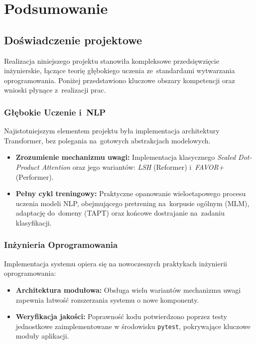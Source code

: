 \documentclass[a4paper,11pt,twoside]{report}
\theoremstyle{definition}
\begin{document}
\chapter{Podsumowanie}

\section{Doświadczenie projektowe}

Realizacja niniejszego projektu stanowiła kompleksowe przedsięwzięcie inżynierskie, łączące teorię głębokiego uczenia ze~standardami wytwarzania oprogramowania. Poniżej przedstawiono kluczowe obszary kompetencji oraz wnioski płynące z~realizacji prac.

\subsection{Głębokie Uczenie i~NLP}

Najistotniejszym elementem projektu była implementacja architektury Transformer, bez polegania na~gotowych abstrakcjach modelowych.
\begin{itemize}
    \item \textbf{Zrozumienie mechanizmu uwagi:} Implementacja klasycznego \textit{Scaled Dot-Product Attention} oraz jego wariantów: \textit{LSH} (Reformer) i~\textit{FAVOR+} (Performer).
    \item \textbf{Pełny cykl treningowy:} Praktyczne opanowanie wieloetapowego procesu uczenia modeli NLP, obejmującego pretrening na~korpusie ogólnym (MLM), adaptację do~domeny (TAPT) oraz końcowe dostrajanie na~zadaniu klasyfikacji.
\end{itemize}

\subsection{Inżynieria Oprogramowania}

Implementacja systemu opiera się na nowoczesnych praktykach inżynierii oprogramowania:
\begin{itemize}
    \item \textbf{Architektura modułowa:} Obsługa wielu wariantów mechanizmu uwagi zapewnia łatwość rozszerzania systemu o nowe komponenty.
    \item \textbf{Weryfikacja jakości:} Poprawność kodu potwierdzono poprzez testy jednostkowe zaimplementowane w środowisku \texttt{pytest}, pokrywające kluczowe moduły aplikacji.
\end{itemize}
\end{document}
